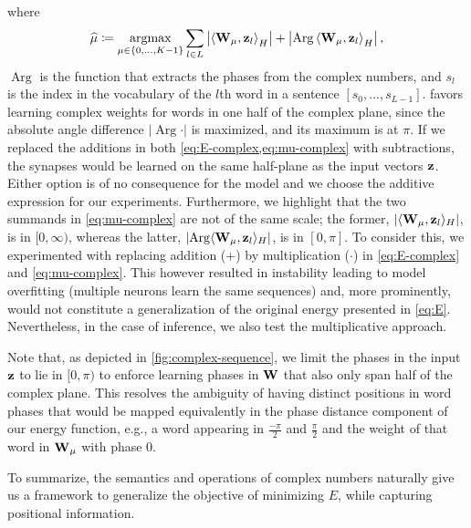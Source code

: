 where
\begin{equation}
\widehat\mu \coloneqq \underset{\mu\in\{0,\dotsc,K-1\}}{\operatorname{argmax}} \sum_{l \in L}{\left\lvert \left\langle\boldsymbol{\mathbf{W}}_{\mu}, \boldsymbol{\mathbf{z}}_{l} \right\rangle_H \right\rvert + \left\lvert \operatorname{Arg}\left\langle\boldsymbol{\mathbf{W}}_{\mu}, \boldsymbol{\mathbf{z}}_l\right\rangle_H\right\rvert, }
\label{eq:mu-complex}
\end{equation}
$\operatorname{Arg}$ is the function that extracts the phases from the complex numbers, and $s_l$ is the index in the vocabulary of the $l$th word in a sentence $[s_0,...,s_{L-1}]$.
 favors learning complex weights for words in one half of the complex plane, since the absolute angle difference $\lvert \operatorname{Arg}\cdot\rvert$ is maximized, and its maximum is at $\pi$.
If we replaced the additions in both \cref{eq:E-complex,eq:mu-complex} with subtractions, the synapses would be learned on the same half-plane as the input vectors $\boldsymbol{\mathbf{z}}$.
Either option is of no consequence for the model and we choose the additive expression for our experiments.
Furthermore, we highlight that the two summands in \cref{eq:mu-complex} are not of the same scale; the former, $\lvert \langle\boldsymbol{\mathbf{W}}_{\mu}, \boldsymbol{\mathbf{z}}_{l} \rangle_H\rvert$, is in $[0, \infty)$, whereas the latter, $\lvert \operatorname{Arg}\langle\boldsymbol{\mathbf{W}}_{\mu}, \boldsymbol{\mathbf{z}}_l\rangle_H\rvert$, is in $[0, \pi]$.
To consider this, we experimented with replacing addition ($+$) by multiplication ($\cdot$) in \cref{eq:E-complex} and \cref{eq:mu-complex}. 
This however resulted in instability leading to model overfitting (multiple neurons learn the same sequences) and, more prominently, would not constitute a generalization of the original energy presented in \cref{eq:E}.
Nevertheless, in the case of inference, we also test the multiplicative approach. 

\par
Note that, as depicted in \cref{fig:complex-sequence}, we limit the phases in the input $\boldsymbol{\mathbf{z}}$ to lie in $[0,\pi)$ to enforce learning phases in $\boldsymbol{\mathbf{W}}$ that also only span half of the complex plane.
This resolves the ambiguity of having distinct positions in word phases that would be mapped equivalently in the phase distance component of our energy function, e.g., a word appearing in $\frac{-\pi}{2}$ and $\frac{\pi}{2}$ and the weight of that word in $\boldsymbol{\mathbf{W}}_{\mu}$ with phase $0$.

\par
To summarize, the semantics and operations of complex numbers naturally give us a framework to generalize the objective of minimizing $E$, while capturing positional information.

